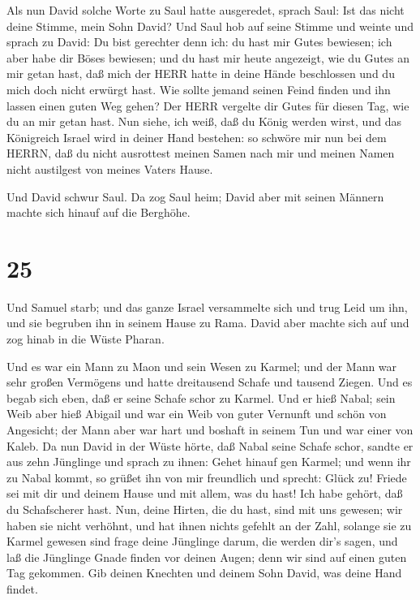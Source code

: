  Als nun David solche Worte zu Saul hatte ausgeredet,
sprach Saul: Ist das nicht deine Stimme, mein Sohn David? Und Saul hob
auf seine Stimme und weinte  und sprach zu David: Du bist
gerechter denn ich: du hast mir Gutes bewiesen; ich aber habe dir Böses
bewiesen;  und du hast mir heute angezeigt, wie du Gutes an
mir getan hast, daß mich der HERR hatte in deine Hände beschlossen und
du mich doch nicht erwürgt hast.  Wie sollte jemand seinen
Feind finden und ihn lassen einen guten Weg gehen? Der HERR vergelte dir
Gutes für diesen Tag, wie du an mir getan hast.  Nun siehe,
ich weiß, daß du König werden wirst, und das Königreich Israel wird in
deiner Hand bestehen:  so schwöre mir nun bei dem HERRN,
daß du nicht ausrottest meinen Samen nach mir und meinen Namen nicht
austilgest von meines Vaters Hause.

 Und David schwur Saul. Da zog Saul heim; David aber mit
seinen Männern machte sich hinauf auf die Berghöhe.

\hypertarget{section-24}{%
\section{25}\label{section-24}}

 Und Samuel starb; und das ganze Israel versammelte sich und
trug Leid um ihn, und sie begruben ihn in seinem Hause zu Rama. David
aber machte sich auf und zog hinab in die Wüste Pharan.

 Und es war ein Mann zu Maon und sein Wesen zu Karmel; und
der Mann war sehr großen Vermögens und hatte dreitausend Schafe und
tausend Ziegen. Und es begab sich eben, daß er seine Schafe schor zu
Karmel.  Und er hieß Nabal; sein Weib aber hieß Abigail und
war ein Weib von guter Vernunft und schön von Angesicht; der Mann aber
war hart und boshaft in seinem Tun und war einer von Kaleb. 
Da nun David in der Wüste hörte, daß Nabal seine Schafe schor,
 sandte er aus zehn Jünglinge und sprach zu ihnen: Gehet
hinauf gen Karmel; und wenn ihr zu Nabal kommt, so grüßet ihn von mir
freundlich  und sprecht: Glück zu! Friede sei mit dir und
deinem Hause und mit allem, was du hast!  Ich habe gehört,
daß du Schafscherer hast. Nun, deine Hirten, die du hast, sind mit uns
gewesen; wir haben sie nicht verhöhnt, und hat ihnen nichts gefehlt an
der Zahl, solange sie zu Karmel gewesen sind  frage deine
Jünglinge darum, die werden dir's sagen, und laß die Jünglinge Gnade
finden vor deinen Augen; denn wir sind auf einen guten Tag gekommen. Gib
deinen Knechten und deinem Sohn David, was deine Hand findet.

